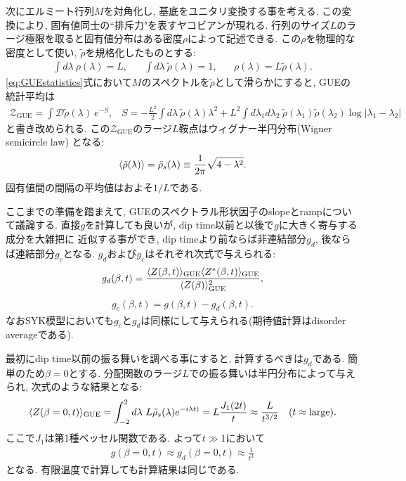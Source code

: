 次にエルミート行列$M$を対角化し, 基底をユニタリ変換する事を考える. 
この変換により, 固有値同士の``排斥力"を表すヤコビアンが現れる. 
行列のサイズ$L$のラージ極限を取ると固有値分布はある密度$\rho$によって記述できる. 
この$\rho$を物理的な密度として使い, $\tilde{\rho}$を規格化したものとする:
\begin{align}
	\int d\lambda\ \rho(\lambda) = L,\hspace{20pt}
	\int d\lambda\ \tilde{\rho}(\lambda) = 1,\hspace{20pt}
	\rho(\lambda) = L\tilde{\rho}(\lambda).
\end{align}
\eqref{eq:GUEstatistics}式において$M$のスペクトルを$\tilde{\rho}$として滑らかにすると, 
GUEの統計平均は
\begin{align}
	\mathcal{Z}_{\mathrm{GUE}} = \int \mathcal{D}\tilde{\rho}(\lambda)\ e^{-S},
	\hspace{10pt}
	S 
	= -\frac{L^2}{2} \int d\lambda\ \tilde{\rho}(\lambda)\lambda^2
	+ L^2 \int d\lambda_1 d\lambda_2\ \tilde{\rho}(\lambda_1)\tilde{\rho}(\lambda_2)
		\log|\lambda_1 - \lambda_2|
	\label{eq:GUEstatistics_in_large_L}
\end{align}
と書き改められる. 
この$\mathcal{Z}_{\mathrm{GUE}}$のラージ$L$鞍点はウィグナー半円分布(Wigner semicircle law)
となる:
\begin{align}
	\langle \tilde{\rho}(\lambda) \rangle = \tilde{\rho}_s(\lambda)\equiv
	\frac{1}{2\pi}\sqrt{4 - \lambda^2}.
	\label{eq:semicircle_law}
\end{align}
固有値間の間隔の平均値はおよそ$1/L$である. 

ここまでの準備を踏まえて, GUEのスペクトラル形状因子のslopeとrampについて議論する. 
直接$g$を計算しても良いが, dip time以前と以後で$g$に大きく寄与する成分を大雑把に
近似する事ができ, dip timeより前ならば非連結部分$g_d$, 後ならば連結部分$g_c$となる. 
$g_d$および$g_c$はそれぞれ次式で与えられる:
\begin{align}
	g_d(\beta, t)
	= \frac{\langle Z(\beta, t) \rangle_{\mathrm{GUE}}\langle Z^*(\beta, t) \rangle_{\mathrm{GUE}}}
		{\langle Z(\beta) \rangle_{\mathrm{GUE}}^2},
	\label{eq:disconnected_piece}
\end{align}
\begin{align}
	g_c(\beta, t) = g(\beta, t) - g_d(\beta, t).
	\label{eq:connected_piece}
\end{align}
なおSYK模型においても$g_c$と$g_d$は同様にして与えられる(期待値計算はdisorder averageである). 

最初にdip time以前の振る舞いを調べる事にすると, 計算するべきは$g_d$である. 
簡単のため$\beta = 0$とする. 
分配関数のラージ$L$での振る舞いは半円分布によって与えられ, 次式のような結果となる:
\begin{align}
	\langle Z(\beta=0, t) \rangle_{\mathrm{GUE}}
	= \int_{-2}^2 d\lambda\ L\tilde{\rho}_s(\lambda)e^{-i\lambda t)}
	= L\frac{J_1(2t)}{t}
	\approx \frac{L}{t^{3/2}}
	\hspace{10pt}(t \approx \mathrm{large}).
\end{align}
ここで$J_1$は第1種ベッセル関数である. 
よって$t \gg 1$において
\begin{align}
	g(\beta = 0, t) \approx g_d(\beta = 0, t) \approx \frac{1}{t^3}
	\label{eq:late_time_slope_in_RMT}
\end{align}
となる. 有限温度で計算しても計算結果は同じである. 

